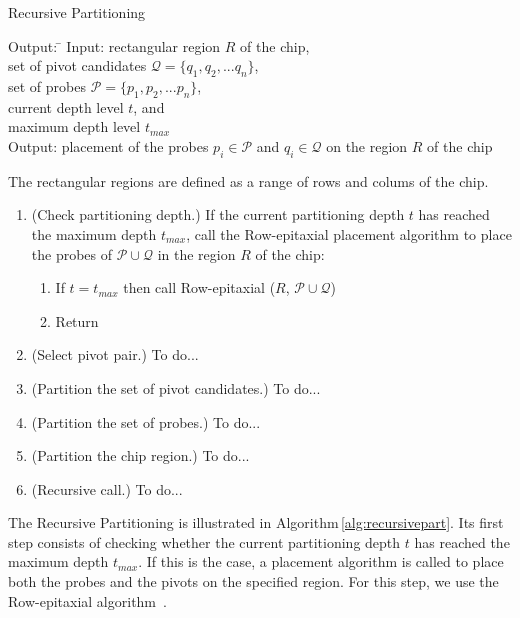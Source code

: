 \documentclass{llncs}
\begin{document}
\begin{algorithm}
\caption{Recursive Partitioning}
\label{alg:recursivepart}
\begin{minipage}{4.8in}

\begin{tabbing}
Output: \=									\kill
Input:  \> rectangular region $R$ of the chip,					\\
        \> set of pivot candidates $\mathcal{Q} = \{q_{1}, q_{2}, ... q_{n}\}$, \\
        \> set of probes $\mathcal{P} = \{p_{1}, p_{2}, ... p_{n}\}$,		\\
        \> current depth level $t$, and						\\
        \> maximum depth level $t_{max}$					\\
Output: \> placement of the probes $p_i \in \mathcal{P}$ and
           $q_i \in \mathcal{Q}$ on the region $R$ of the chip
\end{tabbing}

The rectangular regions are defined as a range of rows and colums of the chip.

\begin{enumerate}
\item (Check partitioning depth.) If the current partitioning depth $t$ has reached
the maximum depth $t_{max}$, call the Row-epitaxial placement algorithm to place the
probes of $\mathcal{P} \cup \mathcal{Q}$ in the region $R$ of the chip:
  \begin{enumerate}
  \item If $t = t_{max}$ then call Row-epitaxial ($R$, $\mathcal{P} \cup \mathcal{Q}$)
  \item Return
  \end{enumerate}
\item (Select pivot pair.) To do...
\item (Partition the set of pivot candidates.) To do...
\item (Partition the set of probes.) To do...
\item (Partition the chip region.) To do...
\item (Recursive call.) To do...
\end{enumerate}

\end{minipage}
\end{algorithm}

The Recursive Partitioning is illustrated in Algorithm\,\ref{alg:recursivepart}. Its first
step consists of checking whether the current partitioning depth $t$ has reached the maximum
depth $t_{max}$. If this is the case, a placement algorithm is called to place both the probes
and the pivots on the specified region. For this step, we use the Row-epitaxial
algorithm~\cite{KAHNG03A}.
\end{document}

